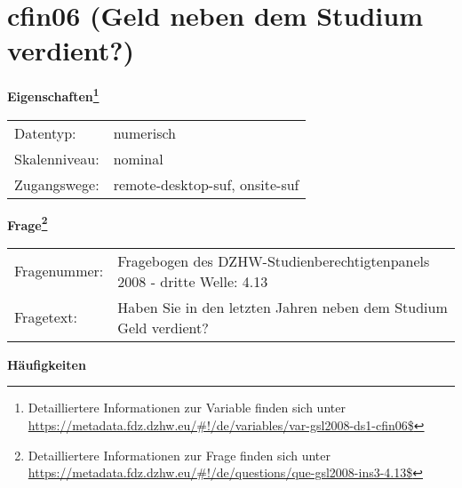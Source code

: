 
    \setcounter{footnote}{0}

    \vspace*{-1.8cm}
	\section{cfin06 (Geld neben dem Studium verdient?)}
	\label{section:cfin06}



    \vspace*{0.5cm}
    \noindent\textbf{Eigenschaften\footnote{Detailliertere Informationen zur Variable finden sich unter
		\url{https://metadata.fdz.dzhw.eu/\#!/de/variables/var-gsl2008-ds1-cfin06$}}}\\
	\begin{tabularx}{\hsize}{@{}lX}
	Datentyp: & numerisch \\
	Skalenniveau: & nominal \\
	Zugangswege: &
	  remote-desktop-suf, 
	  onsite-suf
 \\
    \end{tabularx}



				\vspace*{0.5cm}
                \noindent\textbf{Frage\footnote{Detailliertere Informationen zur Frage finden sich unter
		              \url{https://metadata.fdz.dzhw.eu/\#!/de/questions/que-gsl2008-ins3-4.13$}}}\\
				\begin{tabularx}{\hsize}{@{}lX}
					Fragenummer: &
					  Fragebogen des DZHW-Studienberechtigtenpanels 2008 - dritte Welle:
					  4.13
 \\
					Fragetext: & Haben Sie in den letzten Jahren neben dem Studium Geld verdient? \\
				\end{tabularx}





        		\vspace*{0.5cm}
                \noindent\textbf{Häufigkeiten}

